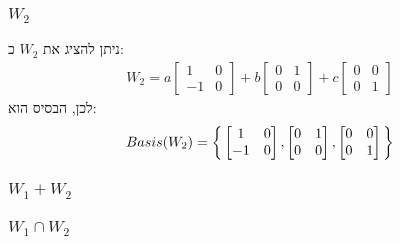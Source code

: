 \documentclass[a4paper, 12pt, leqno]{article}
\newcommand{\subsub}[1]{\subsubsection{\underline{#1}}}
\newcommand{\eq}[1]{\begin{align*}#1\end{align*}}
\newcommand{\bigset}[1]{\bigg{\{} #1 \bigg{\}}}
\begin{document}
\subsub{$W_2$}
ניתן להציג את $W_2$ כ:
\eq{
    W_2=
    a\begin{bmatrix}
        1 & 0 \\ -1 & 0
    \end{bmatrix}
    +b\begin{bmatrix}
        0 & 1 \\ 0 & 0
    \end{bmatrix}
    +c\begin{bmatrix}
        0 & 0 \\ 0 & 1
    \end{bmatrix}
}
לכן, הבסיס הוא:
\eq{
    Basis(W_2)=\bigset{
    \begin{bmatrix}
        1 & 0 \\ -1 & 0
    \end{bmatrix}
    ,\begin{bmatrix}
        0 & 1 \\ 0 & 0
    \end{bmatrix}
    ,\begin{bmatrix}
        0 & 0 \\ 0 & 1
    \end{bmatrix}}
}
\subsub{$W_1+W_2$}
\subsub{$W_1\cap{W_2}$}

\pagebreak
\end{document}
